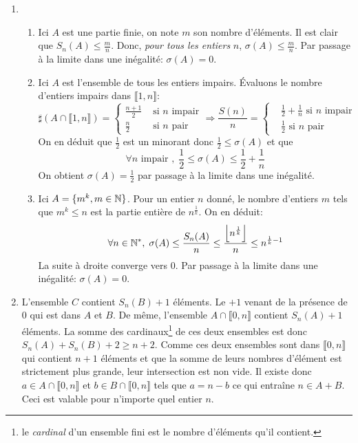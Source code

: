 \begin{enumerate}
\item \begin{enumerate}
  \item Ici $A$ est une partie finie, on note $m$ son nombre d'éléments. Il est clair que $S_n(A) \leq \frac{m}{n}$. Donc, \emph{pour tous les entiers} $n$, $\sigma (A) \leq \frac{m}{n}$. Par passage à la limite dans une inégalité: $\sigma (A) =0$.
  \item Ici $A$ est l'ensemble de tous les entiers impairs. \'Evaluons le nombre d'entiers impairs dans $\llbracket 1 ,n \rrbracket$:
\begin{displaymath}
\sharp(A\cap \llbracket 1 ,n \rrbracket) =
\left\lbrace 
\begin{aligned}
  \frac{n+1}{2} &\text{ si $n$ impair} \\ \frac{n}{2} &\text{ si $n$ pair} 
\end{aligned}
\right. \Rightarrow \frac{S(n)}{n}=
\left\lbrace 
\begin{aligned}
  &\frac{1}{2}+\frac{1}{n} \text{ si $n$ impair} \\ &\frac{1}{2} \text{ si $n$ pair} 
\end{aligned}
\right. 
\end{displaymath}
On en déduit que $\frac{1}{2}$ est un minorant donc $\frac{1}{2}\leq \sigma(A)$ et que
\begin{displaymath}
  \forall n \text{ impair }, \; \frac{1}{2} \leq \sigma(A) \leq \frac{1}{2} + \frac{1}{n}
\end{displaymath}
On obtient $\sigma(A) = \frac{1}{2}$ par passage à la limite dans une inégalité.
   
   \item Ici $A=\{m^k,m\in\mathbb{N}\}$. Pour un entier $n$ donné, le nombre d'entiers $m$ tels que $m^k \leq n$ est la partie entière de $n^{\frac{1}{k}}$. On en déduit:
\begin{displaymath}
\forall n \in \mathbb{N}^*,\; \sigma (A) \leq \frac{S_n(A)}{n} \leq \frac{\left \lfloor n^{\frac{1}{k}}\right \rfloor}{n} \leq n^{\frac{1}{k}-1}
\end{displaymath}
La suite à droite converge vers 0. Par passage à la limite dans une inégalité: $\sigma (A)=0$.
\end{enumerate}

\item L'ensemble $C$ contient $S_n(B)+1$ éléments. Le $+1$ venant de la présence de 0 qui est dans $A$ et $B$. De même, l'ensemble $A\cap \llbracket 0,n  \rrbracket$ contient $S_n(A)+1$ éléments. La somme des cardinaux\footnote{le \emph{cardinal} d'un ensemble fini est le nombre d'éléments qu'il contient.} de ces deux ensembles est donc $S_n(A)+S_n(B)+2 \geq n+2$. Comme ces deux ensembles sont dans $\llbracket 0,n  \rrbracket$ qui contient $n+1$ éléments et que la somme de leurs nombres d'élément est strictement plus grande, leur intersection est non vide. Il existe donc $a\in A \cap \llbracket 0,n  \rrbracket$ et $b \in B \cap \llbracket 0,n  \rrbracket$ tels que $a=n-b$ ce qui entraîne $n\in A+B$. Ceci est valable pour n'importe quel entier $n$.


\end{enumerate}
